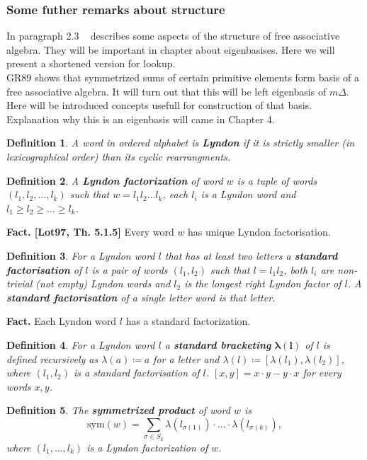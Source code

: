 \documentclass[a4paper, 12pt]{report}
\newtheorem{definition}{Definition}
\begin{document}
\subsubsection{Some futher remarks about structure}
In paragraph 2.3 ~\cite{Diaconis2014} describes some aspects of the structure of free associative algebra.
They will be important in chapter about eigenbasises. Here we will present a shortened version for lookup. \\ 
GR89 shows that symmetrized sums of certain primitive elements form basis of a free associative algebra. 
It will turn out that this will be left eigenbasis of $m\Delta$. 
Here will be introduced concepts usefull for 
construction of that basis. Explanation why this is an eigenbasis will came in Chapter 4.
\begin{definition}
A word in ordered alphabet is \textbf{Lyndon} if it is strictly smaller (in lexicographical order) than its 
cyclic rearrangments. 
\end{definition}
\begin{definition}
A \textbf{Lyndon factorization} of word $w$ is a tuple of words $(l_1, l_2, \dots, l_k)$ such that 
$w = l_1l_2\dots l_k$, each $l_i$ is a Lyndon word and $l_1 \geq l_2 \geq \dots \geq l_k$. 
\end{definition}
\noindent\textbf{Fact. [Lot97, Th. 5.1.5]} Every word $w$ has unique Lyndon factorisation. 
\begin{definition}
For a Lyndon word $l$ that has at least two letters a \textbf{standard factorisation} of $l$ is a pair of 
words $(l_1, l_2)$ such that $l = l_1l_2$, both $l_i$ are non-trivial (not empty) Lyndon words and $l_2$ 
is the longest right Lyndon factor of $l$. A \textbf{standard factorisation} of a single letter word is that 
letter.
\end{definition}
\noindent\textbf{Fact.} Each Lyndon word $l$ has a standard factorization.
\begin{definition}
For a Lyndon word $l$ a \textbf{standard bracketing} $\boldsymbol{\lambda(l)}$ of $l$ is defined recursively 
as 
$\lambda(a) \coloneqq a$ for a letter and $\lambda(l) \coloneqq [\lambda(l_1), \lambda(l_2)]$, where $(l_1, 
l_2)$ 
is a standard factorisation of $l$. $[x, y] = x\cdot y - y\cdot x$ for every words $x, y$. 
\end{definition}
\begin{definition}
The \textbf{symmetrized product} of word $w$ is 
\begin{equation*}
\mathrm{sym}(w) = \sum_{\sigma \in S_k} \lambda(l_{\sigma(1)})\cdot\ldots\cdot\lambda(l_{\sigma(k)}),
\end{equation*}
where $(l_1, \dots, l_k)$ is a Lyndon factorization of $w$.
\end{definition}
\end{document}
